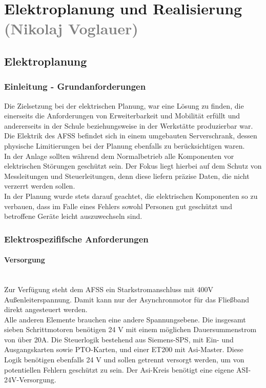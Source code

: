 \section{Elektroplanung und Realisierung \textcolor{gray}{(Nikolaj Voglauer)}}

\subsection{Elektroplanung}
\label{sec:Elektroplanung}

\subsubsection{Einleitung - Grundanforderungen}
    Die Zielsetzung bei der elektrischen Planung, war eine Lösung zu finden, die einerseits die Anforderungen von Erweiterbarkeit und Mobilität erfüllt und andererseits in der Schule beziehungsweise in der Werkstätte produzierbar war. Die Elektrik des AFSS befindet sich in einem umgebauten Serverschrank, dessen physische Limitierungen bei der Planung ebenfalls zu berücksichtigen waren.\\
    In der Anlage sollten während dem Normalbetrieb alle Komponenten vor elektrischen Störungen geschützt sein. Der Fokus liegt hierbei auf dem Schutz von Messleitungen und Steuerleitungen, denn diese liefern präzise Daten, die nicht verzerrt werden sollen.\\ 
    In der Planung wurde stets darauf geachtet, die elektrischen Komponenten so zu verbauen, dass im Falle eines Fehlers sowohl Personen gut geschützt und betroffene Geräte leicht auszuwechseln sind.\\

\subsubsection{Elektrospezififsche Anforderungen}
\label{sec:Elektrik spezififsche Anforderungen}

    \paragraph{Versorgung}\mbox{}\\
    Zur Verfügung steht dem AFSS ein Starkstromanschluss mit 400V Außenleiterspannung. Damit kann nur der Asynchronmotor für das Fließband direkt angesteuert werden.\\
    Alle anderen Elemente brauchen eine andere Spannungsebene. Die insgesamt sieben Schrittmotoren benötigen 24 V mit einem möglichen Dauersummenstrom von über 20A. Die Steuerlogik bestehend aus Siemens-SPS, mit Ein- und Ausgangskarten sowie PTO-Karten, und einer ET200 mit Asi-Master. Diese Logik benötigen ebenfalls 24 V und sollen getrennt versorgt werden, um von potentiellen Fehlern geschützt zu sein. Der Asi-Kreis benötigt eine eigene ASI-24V-Versorgung.

